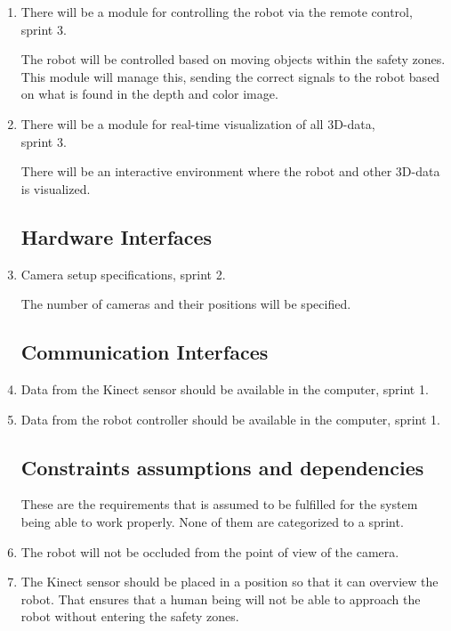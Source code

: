 \documentclass[10pt,a4paper]{article}
\begin{document}
\begin{enumerate}
\item There will be a module for controlling the robot via the remote control, sprint 3.

{\addtolength{\leftskip}{5mm}The robot will be controlled based on moving objects within the safety zones. This module will manage this, sending the correct signals to the robot based on what is found in the depth and color image.
\par}

\item There will be a module for real-time visualization of all 3D-data,\\ sprint 3.

{\addtolength{\leftskip}{5mm}There will be an interactive environment where the robot and other 3D-data is visualized.\par}

\subsection{Hardware Interfaces}

\item Camera setup specifications, sprint 2.

{\addtolength{\leftskip}{5mm} The number of cameras and their positions will be specified.\par}

\subsection{Communication Interfaces}

\item Data from the Kinect sensor should be available in the computer, sprint 1.
\item Data from the robot controller should be available in the computer, sprint 1.

\subsection{Constraints assumptions and dependencies}
These are the requirements that is assumed to be fulfilled for the system being able to work properly. None of them are categorized to a sprint.

\item The robot will not be occluded from the point of view of the camera.

\item The Kinect sensor should be placed in a position so that it can overview the robot. That ensures that a human being will not be able to approach the robot without entering the safety zones.


\end{enumerate}
\end{document}
